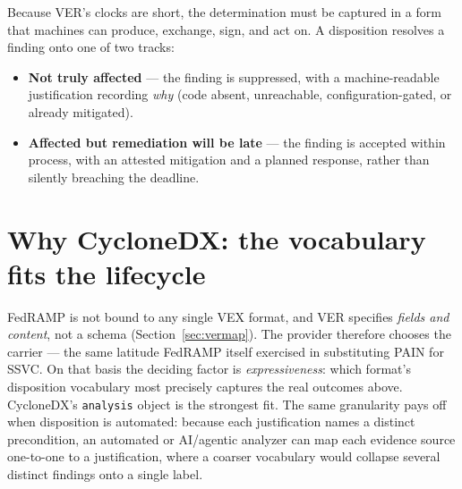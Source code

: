 \documentclass[11pt]{article}
\newcommand{\code}[1]{\texttt{#1}}
\begin{document}
Because VER's clocks are short, the determination must be captured in a form that
machines can produce, exchange, sign, and act on. A disposition resolves a finding onto
one of two tracks:
\begin{itemize}[leftmargin=1.5em,nosep,topsep=3pt]
\item \textbf{Not truly affected} --- the finding is suppressed, with a machine-readable
  justification recording \emph{why} (code absent, unreachable, configuration-gated, or
  already mitigated).
\item \textbf{Affected but remediation will be late} --- the finding is accepted within
  process, with an attested mitigation and a planned response, rather than silently
  breaching the deadline.
\end{itemize}

\section{Why CycloneDX: the vocabulary fits the lifecycle}
FedRAMP is not bound to any single VEX format, and VER specifies \emph{fields and
content}, not a schema (Section~\ref{sec:vermap}). The provider therefore chooses the
carrier --- the same latitude FedRAMP itself exercised in substituting PAIN for SSVC.
On that basis the deciding factor is \emph{expressiveness}: which format's disposition
vocabulary most precisely captures the real outcomes above. CycloneDX's \code{analysis}
object is the strongest fit. The same granularity pays off when disposition is
automated: because each justification names a distinct precondition, an automated or
AI/agentic analyzer can map each evidence source one-to-one to a justification, where a
coarser vocabulary would collapse several distinct findings onto a single label.
\end{document}
